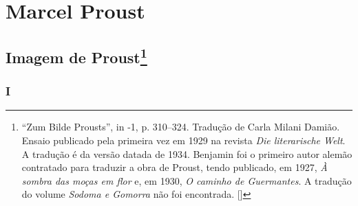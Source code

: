 \movetooddpage
{}
\part*{Marcel Proust}

\chapter{Imagem de Proust\footnote[*]{``Zum Bilde Prousts'', in -1, p. 310--324. Tradução de Carla Milani Damião. Ensaio publicado pela primeira vez em 1929 na revista \emph{Die literarische Welt}. A tradução é da versão datada de 1934. Benjamin foi o primeiro autor alemão contratado para traduzir a obra de Proust, tendo publicado, em 1927, \emph{À sombra das moças em flor} e, em 1930, \emph{O caminho de Guermantes}. A tradução do volume \emph{Sodoma e Gomorra} não foi encontrada. []}}

\section{I}

